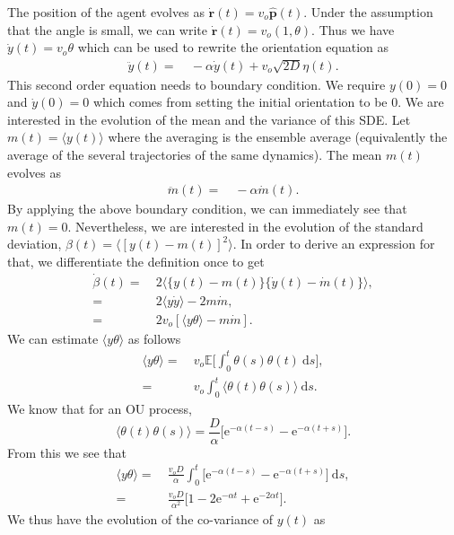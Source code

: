 \documentclass[12pt]{article}
\def\d{\text{d}}
\def\e{\text{e}}
\def\r{\mathbf{r}}
\def\E{\mathbb{E}}
\def\ph{\hat{\mathbf{p}}}
\def\yd{\dot{y}}
\begin{document}
The position of the agent evolves as $\dot{\r}(t) = v_o \ph(t)$. Under the assumption that the angle
is small, we can write $\dot{\r}(t) = v_o (1, \theta)$. Thus we have $\yd (t) = v_o \theta$ which can
be used to rewrite the orientation equation as
\begin{align}
    \ddot{y}(t) =& \ - \alpha \yd (t) + v_o\sqrt{2 D} \eta(t).
\end{align}
This second order equation needs to boundary condition. We require $y(0) = 0$ and $\yd (0) = 0$ which
comes from setting the initial orientation to be 0. We are interested in the evolution of the mean and the variance of this SDE. Let $m(t)= \langle y(t) \rangle$
where the averaging is the ensemble average (equivalently the average of the several trajectories of the
same dynamics). The mean $m(t)$ evolves as
\begin{align}
    \ddot{m}(t) =& \ -\alpha \dot{m}(t).
\end{align}
By applying the above boundary condition, we can immediately see that $m(t) = 0$. Nevertheless, we are
interested in the evolution of the standard deviation, $\beta(t) = \langle {[y(t) - m(t)]}^2 \rangle$.
In order to derive an expression for that, we differentiate the definition once to get
\begin{align*}
    \dot{\beta}(t) =& \ 2 \langle \{ y(t) - m(t) \} \{ \yd(t) - \dot{m}(t) \} \rangle, \\
    = & \ 2 \langle y \yd \rangle - 2 m \dot{m}, \\
    = & \ 2 v_o [ \langle y \theta \rangle - m \dot{m}].
\end{align*}
We can estimate $\langle y \theta \rangle$ as follows
\begin{align*}
    \langle y \theta \rangle =& \ v_o \E \bigg[ \int_0^t \theta(s) \theta(t) \ \d s \bigg], \\
    =& \ v_o  \int_0^t \langle\theta(t) \theta(s)\rangle \ \d s.
\end{align*}
We know that for an OU process, 
\[
\langle\theta(t) \theta(s)\rangle = \frac{D}{\alpha} \bigg[ \e^{-\alpha(t-s)}-\e^{-\alpha(t+s)} \bigg].
\]
From this we see that
\begin{align*}
    \langle y \theta \rangle =& \ \frac{v_o D}{\alpha} \int_0^t  \bigg[ \e^{-\alpha(t-s)}-\e^{-\alpha(t+s)} \bigg] \ \d s, \\
    =& \ \frac{v_o D}{\alpha^2} \bigg[ 1 - 2 \e^{-\alpha t} + \e^{-2 \alpha t}\bigg].
\end{align*}
We thus have the evolution of the co-variance of $y(t)$ as
\end{document}
